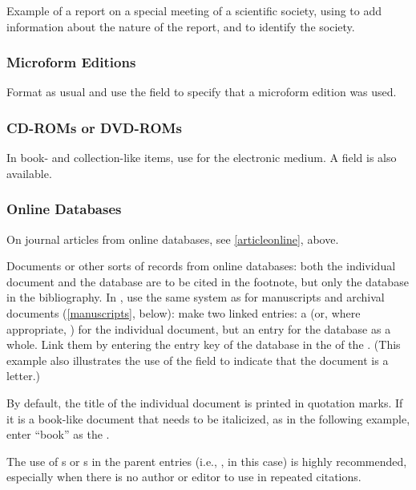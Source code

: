 \documentclass{ltxdockit}[2010/02/12]
\begin{document}
Example of a report on a special meeting of a scientific society, using  to add information about the nature of the report, and  to identify the society.\autocites[][]{gdna:1922-as-report}

\subsubsection{Microform Editions}
Format as usual and use the  field to specify that a microform edition was used.\autocites[][]{weismann1872uber-den-einflu}

\subsubsection{CD-ROMs or DVD-ROMs}
In book- and collection-like items, use  for the electronic medium.\autocites[][]{2001das-dritte-reich} A   field is also available.

\subsubsection{Online Databases}\label{onlinedatabases}
On journal articles from online databases, see \ref{articleonline}, above. 

Documents or other sorts of records from online databases: both the individual document and the database are to be cited in the footnote, but only the database in the bibliography. In , use the same system as for manuscripts and archival documents (\ref{manuscripts}, below): make two linked entries: a  (or, where appropriate, ) for the individual document, but an  entry for the database as a whole. Link them by entering the entry key of the  database in the  of the . (This example also illustrates the use of the  field to indicate that the document is a letter.)\autocites[][]{darwin1881mr.-darwin-on-v} 

By default, the title of the individual document is printed in quotation marks. If it is a book-like document that needs to be italicized, as in the following example, enter ``book'' as the .\autocites[][]{1838-zoology-of-beagle}

The use of s or s in the parent entries (i.e., , in this case) is highly recommended, especially when there is no author or editor to use in repeated citations.
\end{document}
